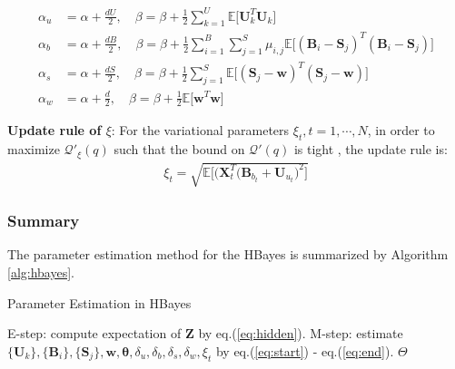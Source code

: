 \begin{align}
\alpha_u & = \alpha + \frac{dU}{2},\quad  \beta=\beta+\frac{1}{2}\sum_{k=1}^{U}\mathbb{E}\big[\mathbf{U}_k^T\mathbf{U}_k\big] \\ 
\alpha_b & = \alpha + \frac{dB}{2},\quad  \beta=\beta+\frac{1}{2}\sum_{i=1}^{B}\sum_{j=1}^{S}\mu_{i,j}\mathbb{E}\big[(\mathbf{B}_i-\mathbf{S}_j)^T(\mathbf{B}_i-\mathbf{S}_j)\big] \\
\alpha_s & = \alpha + \frac{dS}{2},\quad  \beta=\beta+\frac{1}{2}\sum_{j=1}^{S}\mathbb{E}\big[(\mathbf{S}_j-\mathbf{w})^T(\mathbf{S}_j-\mathbf{w})\big] \\
\alpha_w & = \alpha + \frac{d}{2},\quad  \beta=\beta+\frac{1}{2}\mathbb{E}\big[\mathbf{w}^T\mathbf{w}\big] 
\end{align}


\noindent \textbf{Update rule of $\xi$}:
For the variational parameters $\xi_{t}, t=1,\cdots,N$, in order to maximize $\mathcal{Q}'_{\xi}(q)$ such that the bound on $\mathcal{Q}'(q)$ is tight \cite{bishop2006pattern}, the update rule is: 
\begin{align}
\xi_{t}=\sqrt{\mathbb{E}\Big[\big(\bm{X}_t^T(\mathbf{B}_{b_t}+\mathbf{U}_{u_t}\big)^2\Big]}
\label{eq:end}
\end{align}


\subsubsection{Summary}
The parameter estimation method for the HBayes is summarized by Algorithm \ref{alg:hbayes}.

\begin{algorithm}
\caption{Parameter Estimation in HBayes}
\label{alg:hbayes}
\begin{algorithmic}[1]

\Repeat
\State E-step: compute expectation of $\mathbf{Z}$ by eq.(\ref{eq:hidden}).
\State M-step: estimate $\{\bm{U}_k\}, \{\bm{B}_i\}, \{\bm{S}_j\}, \bm{w}, \boldsymbol{\theta}, \delta_u,\delta_b,\delta_s,\delta_w,\xi_{t}$ by eq.(\ref{eq:start}) - eq.(\ref{eq:end}).
\State
\Return $\Theta$
\EndProcedure
\end{algorithmic}
\end{algorithm}

